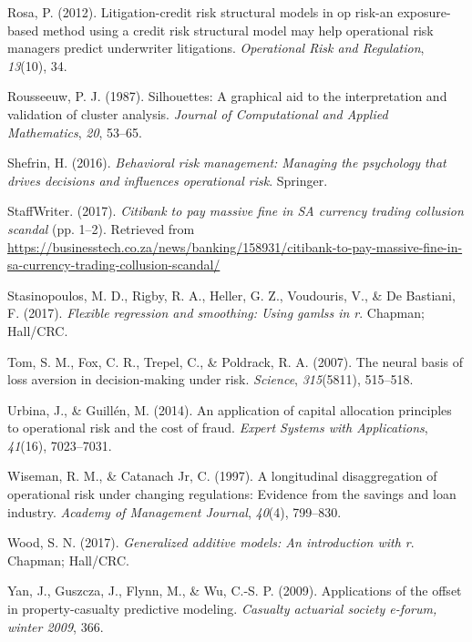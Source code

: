 \documentclass{DissertateUSU}
\begin{document}
\leavevmode\hypertarget{ref-rosa2012litigation}{}%
Rosa, P. (2012). Litigation-credit risk structural models in op risk-an
exposure-based method using a credit risk structural model may help
operational risk managers predict underwriter litigations.
\emph{Operational Risk and Regulation}, \emph{13}(10), 34.

\leavevmode\hypertarget{ref-rousseeuw1987silhouettes}{}%
Rousseeuw, P. J. (1987). Silhouettes: A graphical aid to the
interpretation and validation of cluster analysis. \emph{Journal of
Computational and Applied Mathematics}, \emph{20}, 53--65.

\leavevmode\hypertarget{ref-shefrin2016behavioral}{}%
Shefrin, H. (2016). \emph{Behavioral risk management: Managing the
psychology that drives decisions and influences operational risk}.
Springer.

\leavevmode\hypertarget{ref-bustech2017}{}%
StaffWriter. (2017). \emph{Citibank to pay massive fine in SA currency
trading collusion scandal} (pp. 1--2). Retrieved from
\url{https://businesstech.co.za/news/banking/158931/citibank-to-pay-massive-fine-in-sa-currency-trading-collusion-scandal/}

\leavevmode\hypertarget{ref-stasinopoulos2017flexible}{}%
Stasinopoulos, M. D., Rigby, R. A., Heller, G. Z., Voudouris, V., \& De
Bastiani, F. (2017). \emph{Flexible regression and smoothing: Using
gamlss in r}. Chapman; Hall/CRC.

\leavevmode\hypertarget{ref-tom2007neural}{}%
Tom, S. M., Fox, C. R., Trepel, C., \& Poldrack, R. A. (2007). The
neural basis of loss aversion in decision-making under risk.
\emph{Science}, \emph{315}(5811), 515--518.

\leavevmode\hypertarget{ref-urbina2014application}{}%
Urbina, J., \& Guillén, M. (2014). An application of capital allocation
principles to operational risk and the cost of fraud. \emph{Expert
Systems with Applications}, \emph{41}(16), 7023--7031.

\leavevmode\hypertarget{ref-wiseman1997longitudinal}{}%
Wiseman, R. M., \& Catanach Jr, C. (1997). A longitudinal disaggregation
of operational risk under changing regulations: Evidence from the
savings and loan industry. \emph{Academy of Management Journal},
\emph{40}(4), 799--830.

\leavevmode\hypertarget{ref-wood2017generalized}{}%
Wood, S. N. (2017). \emph{Generalized additive models: An introduction
with r}. Chapman; Hall/CRC.

\leavevmode\hypertarget{ref-yan2009applications}{}%
Yan, J., Guszcza, J., Flynn, M., \& Wu, C.-S. P. (2009). Applications of
the offset in property-casualty predictive modeling. \emph{Casualty
actuarial society e-forum, winter 2009}, 366.


\end{document}

